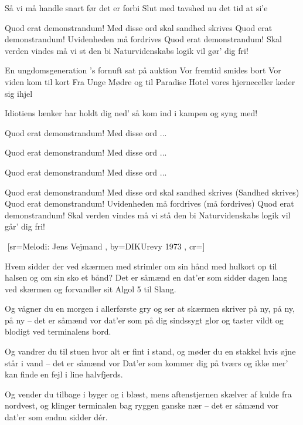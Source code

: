 \documentclass[pdftex,12pt]{article}
\begin{document}
\begin{songs}{}
\endverse
\beginverse
Så vi må handle snart før det er forbi
Slut med tavshed nu det tid at si'e

\endverse
\beginverse
Quod erat demonstrandum!
Med disse ord skal sandhed skrives
Quod erat demonstrandum!
Uvidenheden må fordrives
Quod erat demonstrandum!
Skal verden vindes må vi st den bi
Naturvidenskabs logik vil gør' dig fri!

\endverse
\beginverse
En ungdomsgeneration
's fornuft sat på auktion
Vor fremtid smides bort
Vor viden kom til kort
Fra Unge Mødre og
til Paradise Hotel
vores hjerneceller keder sig ihjel

\endverse
\beginverse
Idiotiens lænker har holdt dig ned'
så kom ind i kampen og syng med!

\endverse
\beginverse
Quod erat demonstrandum! Med disse ord ...

\endverse
\beginverse
Quod erat demonstrandum! Med disse ord ...

\endverse
\beginverse
Quod erat demonstrandum! Med disse ord ...

\endverse
\beginverse
Quod erat demonstrandum!
Med disse ord skal sandhed skrives (Sandhed skrives)
Quod erat demonstrandum!
Uvidenheden må fordrives (må fordrives)
Quod erat demonstrandum!
Skal verden vindes må vi stå den bi
Naturvidenskabs logik vil går' dig fri!

\endverse
\endsong



﻿%
[sr={Melodi: Jens Vejmand}
,
by={DIKUrevy 1973}
,
cr={}]\hypertarget{Hvem Sidder Der Ved Skærmen}{}
\label{song63}

\beginverse
Hvem sidder der ved skærmen
med strimler om sin hånd
med hulkort op til halsen
og om sin sko et bånd?
Det er såmænd en dat'er
som sidder dagen lang
ved skærmen og forvandler
sit Algol 5 til Slang.
\endverse

\beginverse
Og vågner du en morgen
i allerførste gry
og ser at skærmen skriver
på ny, på ny, på ny --
det er såmænd vor dat'er
som på dig sindssygt glor
og taster vildt og blodigt
ved terminalens bord.
\endverse

\beginverse
Og vandrer du til stuen
hvor alt er fint i stand,
og møder du en stakkel
hvis øjne står i vand --
det er såmænd vor Dat'er
som kommer dig på tværs
og ikke mer' kan finde
en fejl i line halvfjerds.
\endverse

\beginverse
Og vender du tilbage
i byger og i blæst,
mens aftenstjernen skælver
af kulde fra nordvest,
og klinger terminalen
bag ryggen ganske nær --
det er såmænd vor dat'er
som endnu sidder dér.
\endverse


\end{songs}
\end{document}
